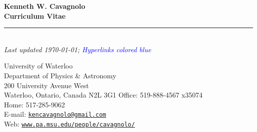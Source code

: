 \documentclass[12pt]{cv}
\begin{document}
\begin{center}
{\large \textbf{Kenneth W. Cavagnolo\\Curriculum Vitae}}\\
\rule{17.35cm}{2pt}\\
\footnotesize
{\it Last updated \today; \textcolor{blue}{Hyperlinks colored blue}}
\normalsize
\end{center}

\addresses
{
University of Waterloo\\
Department of Physics \& Astronomy\\
200 University Avenue West\\
Waterloo, Ontario, Canada N2L 3G1
}
{
Office: 519-888-4567 x35074\\
Home: 517-285-9062\\
E-mail: \href{mailto:kencavagnolo@gmail.com}{\tt{kencavagnolo@gmail.com}}\\
Web: \href{http://www.pa.msu.edu/people/cavagnolo/}{\tt www.pa.msu.edu/people/cavagnolo/}\\
}
\end{document}
